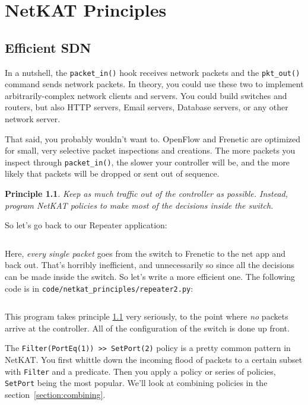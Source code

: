 
\chapter{NetKAT Principles}

\newtheorem{principle}{Principle}

\section{Efficient SDN}

In a nutshell, the \texttt{packet\_in()} hook receives network packets and the \texttt{pkt\_out()} command sends
network packets.  
In theory, you could use these two to implement arbitrarily-complex network clients and servers.  
You could build switches and routers, but also HTTP servers, Email servers, Database servers, or any other 
network server.  

That said, you probably wouldn't want to.
OpenFlow and Frenetic are optimized for small, very selective packet inspections and creations.  
The more packets you inspect through \texttt{packet\_in()}, the slower your controller will be, and
the more likely that packets will be dropped or sent out of sequence.  

\begin{principle}
\label{principle:controller}
Keep as much traffic out of the controller as possible.
Instead, program NetKAT policies to make most of the decisions inside the switch.  
\end{principle}

So let's go back to our Repeater application:

\inputminted{python}{code/quick_start/repeater.py}

Here, \emph{every single packet} goes from the switch to Frenetic to the net app and back out. 
That's horribly inefficient, and unnecessarily so since all the decisions can be made inside the switch.
So let's write a more efficient one.
The following code is in \texttt{code/netkat\_principles/repeater2.py}:

\inputminted{python}{code/netkat_principles/repeater2.py}

This program takes principle \ref{principle:controller} very seriously, to the point where \emph{no} packets 
arrive at the controller.
All of the configuration of the switch is done up front.

The \texttt{Filter(PortEq(1)) >> SetPort(2)} policy is a pretty common pattern in NetKAT.
You first whittle down the incoming flood of packets to a certain subset with \texttt{Filter} and a 
predicate.
Then you apply a policy or series of policies, \texttt{SetPort} being the most popular.
We'll look at combining policies in the section~\ref{section:combining}.

